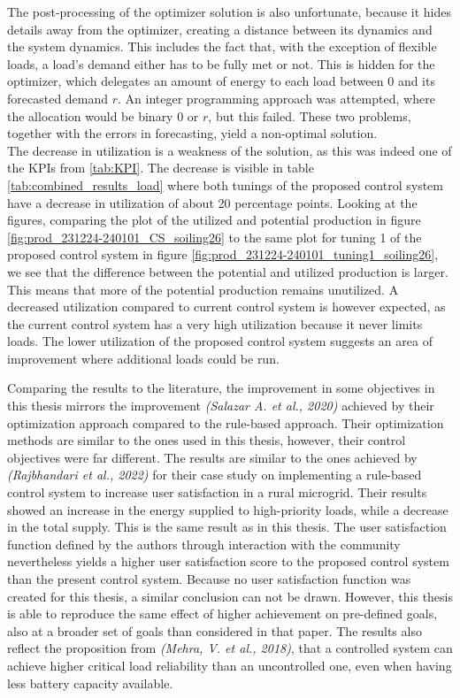 The post-processing of the optimizer solution is also unfortunate, because it hides details away from the optimizer, creating a distance between its dynamics and the system dynamics. This includes the fact that, with the exception of flexible loads, a load's demand either has to be fully met or not. This is hidden for the optimizer, which delegates an amount of energy to each load between 0 and its forecasted demand $r$. An integer programming approach was attempted, where the allocation would be binary 0 or $r$, but this failed. These two problems, together with the errors in forecasting, yield a non-optimal solution.\\

The decrease in utilization is a weakness of the solution, as this was indeed one of the KPIs from \ref{tab:KPI}. The decrease is visible in table \ref{tab:combined_results_load} where both tunings of the proposed control system have a decrease in utilization of about 20 percentage points. Looking at the figures, comparing the plot of the utilized and potential production in figure \ref{fig:prod_231224-240101_CS_soiling26} to the same plot for tuning 1 of the proposed control system in figure \ref{fig:prod_231224-240101_tuning1_soiling26}, we see that the difference between the potential and utilized production is larger. This means that more of the potential production remains unutilized. A decreased utilization compared to current control system is however expected, as the current control system has a very high utilization because it never limits loads. The lower utilization of the proposed control system suggests an area of improvement where additional loads could be run.

Comparing the results to the literature, the improvement in some objectives in this thesis mirrors the improvement \textit{(Salazar A. et al., 2020)} achieved by their optimization approach compared to the rule-based approach. Their optimization methods are similar to the ones used in this thesis, however, their control objectives were far different. The results are similar to the ones achieved by \textit{(Rajbhandari et al., 2022)} for their case study on implementing a rule-based control system to increase user satisfaction in a rural microgrid. Their results showed an increase in the energy supplied to high-priority loads, while a decrease in the total supply. This is the same result as in this thesis. The user satisfaction function defined by the authors through interaction with the community nevertheless yields a higher user satisfaction score to the proposed control system than the present control system. Because no user satisfaction function was created for this thesis, a similar conclusion can not be drawn. However, this thesis is able to reproduce the same effect of higher achievement on pre-defined goals, also at a broader set of goals than considered in that paper. The results also reflect the proposition from \textit{(Mehra, V. et al., 2018)}, that a controlled system can achieve higher critical load reliability than an uncontrolled one, even when having less battery capacity available.\\


